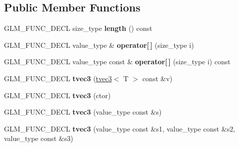 \subsection*{\-Public \-Member \-Functions}
\begin{DoxyCompactItemize}
\item 
\hypertarget{structglm_1_1detail_1_1tvec3_a1812bf851054fe2281b0378eea31ff95}{\-G\-L\-M\-\_\-\-F\-U\-N\-C\-\_\-\-D\-E\-C\-L size\-\_\-type {\bfseries length} () const }\label{structglm_1_1detail_1_1tvec3_a1812bf851054fe2281b0378eea31ff95}

\item 
\hypertarget{structglm_1_1detail_1_1tvec3_a7bed745d0ba3d0b45a2166d13102ca3e}{\-G\-L\-M\-\_\-\-F\-U\-N\-C\-\_\-\-D\-E\-C\-L value\-\_\-type \& {\bfseries operator\mbox{[}$\,$\mbox{]}} (size\-\_\-type i)}\label{structglm_1_1detail_1_1tvec3_a7bed745d0ba3d0b45a2166d13102ca3e}

\item 
\hypertarget{structglm_1_1detail_1_1tvec3_a023498363ed653747f9b6a6f8079f7fe}{\-G\-L\-M\-\_\-\-F\-U\-N\-C\-\_\-\-D\-E\-C\-L value\-\_\-type const \& {\bfseries operator\mbox{[}$\,$\mbox{]}} (size\-\_\-type i) const }\label{structglm_1_1detail_1_1tvec3_a023498363ed653747f9b6a6f8079f7fe}

\item 
\hypertarget{structglm_1_1detail_1_1tvec3_afb5691185de8b87cd4fd5aa34bd9969f}{\-G\-L\-M\-\_\-\-F\-U\-N\-C\-\_\-\-D\-E\-C\-L {\bfseries tvec3} (\hyperlink{structglm_1_1detail_1_1tvec3}{tvec3}$<$ \-T $>$ const \&v)}\label{structglm_1_1detail_1_1tvec3_afb5691185de8b87cd4fd5aa34bd9969f}

\item 
\hypertarget{structglm_1_1detail_1_1tvec3_aef556e22396e99fc3b81bca6fd15f594}{\-G\-L\-M\-\_\-\-F\-U\-N\-C\-\_\-\-D\-E\-C\-L {\bfseries tvec3} (ctor)}\label{structglm_1_1detail_1_1tvec3_aef556e22396e99fc3b81bca6fd15f594}

\item 
\hypertarget{structglm_1_1detail_1_1tvec3_a67da3dd23a3f23f72504bcbfc6f25453}{\-G\-L\-M\-\_\-\-F\-U\-N\-C\-\_\-\-D\-E\-C\-L {\bfseries tvec3} (value\-\_\-type const \&s)}\label{structglm_1_1detail_1_1tvec3_a67da3dd23a3f23f72504bcbfc6f25453}

\item 
\hypertarget{structglm_1_1detail_1_1tvec3_ae0f58f899d4f07e316ec2f7fb936e4eb}{\-G\-L\-M\-\_\-\-F\-U\-N\-C\-\_\-\-D\-E\-C\-L {\bfseries tvec3} (value\-\_\-type const \&s1, value\-\_\-type const \&s2, value\-\_\-type const \&s3)}\label{structglm_1_1detail_1_1tvec3_ae0f58f899d4f07e316ec2f7fb936e4eb}


\end{DoxyCompactItemize}

